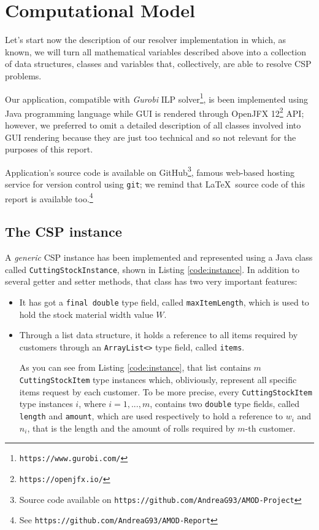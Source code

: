 \documentclass[10pt,a4paper]{article}
\begin{document}
\clearpage
\newpage
\section{Computational Model}

Let's start now the description of our resolver implementation in which, as known, we will turn all mathematical variables described above into a collection of data structures, classes and variables that, collectively, are able to resolve CSP problems.

Our application, compatible with \textit{Gurobi} ILP solver\footnote{\texttt{https://www.gurobi.com/}}, is been implemented using Java programming language while GUI is rendered through OpenJFX 12\footnote{\texttt{https://openjfx.io/}} API; however, we preferred to omit a detailed description of all classes involved into GUI rendering because they are just too technical and so not relevant for the purposes of this report.

Application's source code is available on GitHub\footnote{Source code available on \texttt{https://github.com/AndreaG93/AMOD-Project}}, famous web-based hosting service for version control using \texttt{git}; we remind that \LaTeX\ source code of this report is available too.\footnote{See \texttt{https://github.com/AndreaG93/AMOD-Report}}

\subsection{The CSP instance}

A \textit{generic} CSP instance has been implemented and represented using a Java class called \texttt{CuttingStockInstance}, shown in Listing \ref{code:instance}. In addition to several getter and setter methods, that class has two very important features: 

\begin{itemize}
\item It has got a \texttt{final double} type field, called \texttt{maxItemLength}, which is used to hold the stock material width value $W$.

\item Through a list data structure, it holds a reference to all items required by customers through an \texttt{ArrayList<>} type field, called \texttt{items}. 

As you can see from Listing \ref{code:instance}, that list contains $m$ \texttt{CuttingStockItem} type instances which, obliviously, represent all specific items request by each customer. To be more precise, every \texttt{CuttingStockItem} type instances $i$, where $i = 1,...,m$, contains two \texttt{double} type fields, called \texttt{length} and \texttt{amount}, which are used respectively to hold a reference to $w_i$ and $n_i$, that is the length and the amount of rolls required by $m$-th customer. 
\end{itemize}
\end{document}
